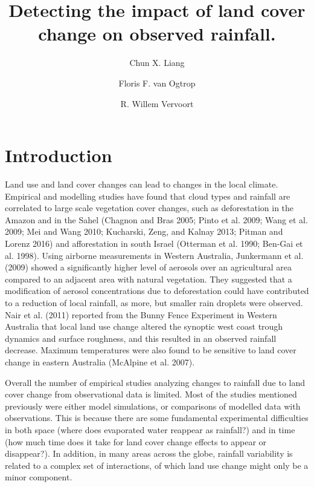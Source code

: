 \documentclass[fleqn,10pt,lineno]{wlpeerj} %
\title{Detecting the impact of land cover change on observed rainfall.}
\author[1]{Chun X. Liang}
\author[1]{Floris F. van Ogtrop}
\author[1]{R. Willem Vervoort}
\affil[1]{Sydney Institute of Agriculture, The University of Sydney, NSW 2006}
\begin{document}
\flushbottom
\maketitle
\thispagestyle{empty}

\section*{Introduction}\label{introduction}

Land use and land cover changes can lead to changes in the local
climate. Empirical and modelling studies have found that cloud types and
rainfall are correlated to large scale vegetation cover changes, such as
deforestation in the Amazon and in the Sahel (Chagnon and Bras 2005;
Pinto et al. 2009; Wang et al. 2009; Mei and Wang 2010; Kucharski, Zeng,
and Kalnay 2013; Pitman and Lorenz 2016) and afforestation in south
Israel (Otterman et al. 1990; Ben-Gai et al. 1998). Using airborne
measurements in Western Australia, Junkermann et al. (2009) showed a
significantly higher level of aerosols over an agricultural area
compared to an adjacent area with natural vegetation. They suggested
that a modification of aerosol concentrations due to deforestation could
have contributed to a reduction of local rainfall, as more, but smaller
rain droplets were observed. Nair et al. (2011) reported from the Bunny
Fence Experiment in Western Australia that local land use change altered
the synoptic west coast trough dynamics and surface roughness, and this
resulted in an observed rainfall decrease. Maximum temperatures were
also found to be sensitive to land cover change in eastern Australia
(McAlpine et al. 2007).

Overall the number of empirical studies analyzing changes to rainfall
due to land cover change from observational data is limited. Most of the
studies mentioned previously were either model simulations, or
comparisons of modelled data with observations. This is because there
are some fundamental experimental difficulties in both space (where does
evaporated water reappear as rainfall?) and in time (how much time does
it take for land cover change effects to appear or disappear?). In
addition, in many areas across the globe, rainfall variability is
related to a complex set of interactions, of which land use change might
only be a minor component.
\end{document}
